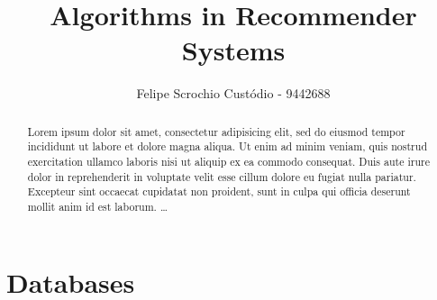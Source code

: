 \documentclass{llncs}
\begin{document}
\title{Algorithms in Recommender Systems}


\author{Felipe Scrochio Custódio - 9442688}



\maketitle              %

\begin{abstract}
        Lorem ipsum dolor sit amet, consectetur adipisicing elit, sed do eiusmod tempor incididunt ut labore et dolore magna aliqua. Ut enim ad minim veniam, quis nostrud exercitation ullamco laboris nisi ut aliquip ex ea commodo consequat. Duis aute irure dolor in reprehenderit in voluptate velit esse cillum dolore eu fugiat nulla pariatur. Excepteur sint occaecat cupidatat non proident, sunt in culpa qui officia deserunt mollit anim id est laborum.
\dots
\end{abstract}

\section{Databases}\label{intro}
%
\end{document}
